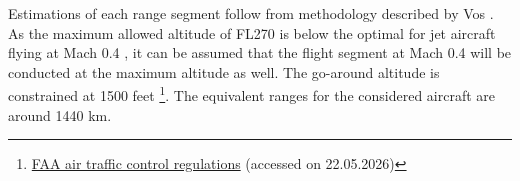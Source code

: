 Estimations of each range segment follow from methodology described by Vos \cite{Vos}. As the maximum allowed altitude of FL270 is below the optimal for jet aircraft flying at Mach 0.4 \cite{Koutz1952Loitering}, it can be assumed that the flight segment at Mach 0.4 will be conducted at the maximum altitude as well. %
The go-around altitude is constrained at 1500 feet \footnote{\href{https://www.faa.gov/air_traffic/publications/atpubs/aim_html/chap4_section_3.html?utm_source=chatgpt.com}{FAA air traffic control regulations} (accessed on 22.05.2026)}. The equivalent ranges for the considered aircraft are around 1440 km. %

